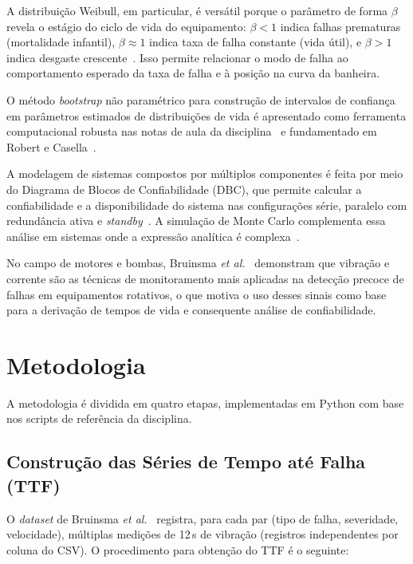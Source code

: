 \documentclass[conference]{IEEEtran}
\begin{document}
A distribuição Weibull, em particular, é versátil porque o parâmetro de
forma $\beta$ revela o estágio do ciclo de vida do equipamento: $\beta
< 1$ indica falhas prematuras (mortalidade infantil), $\beta \approx 1$
indica taxa de falha constante (vida útil), e $\beta > 1$ indica
desgaste crescente~\cite{bessani2026,oconnor2012}. Isso permite
relacionar o modo de falha ao comportamento esperado da taxa de falha
e à posição na curva da banheira.

O método \textit{bootstrap} não paramétrico para construção de
intervalos de confiança em parâmetros estimados de distribuições de
vida é apresentado como ferramenta computacional robusta nas notas de
aula da disciplina~\cite{bessani2026} e fundamentado em Robert e
Casella~\cite{robert2010}.

A modelagem de sistemas compostos por múltiplos componentes é feita por
meio do Diagrama de Blocos de Confiabilidade (DBC), que permite calcular
a confiabilidade e a disponibilidade do sistema nas configurações série,
paralelo com redundância ativa e \textit{standby}~\cite{oconnor2012,
bessani2026}. A simulação de Monte Carlo complementa essa análise em
sistemas onde a expressão analítica é complexa~\cite{zio2013,bessani2026}.

No campo de motores e bombas, Bruinsma \textit{et al.}~\cite{bruinsma2024}
demonstram que vibração e corrente são as técnicas de monitoramento mais
aplicadas na detecção precoce de falhas em equipamentos rotativos, o que
motiva o uso desses sinais como base para a derivação de tempos de vida
e consequente análise de confiabilidade.

\section{Metodologia}

A metodologia é dividida em quatro etapas, implementadas em Python com
base nos scripts de referência da disciplina.

\subsection{Construção das Séries de Tempo até Falha (TTF)}

O \textit{dataset} de Bruinsma \textit{et al.}~\cite{bruinsma2024} registra, para
cada par (tipo de falha, severidade, velocidade), múltiplas medições de
12\,s de vibração (registros independentes por coluna do CSV). O procedimento para obtenção do
TTF é o seguinte:
\end{document}
